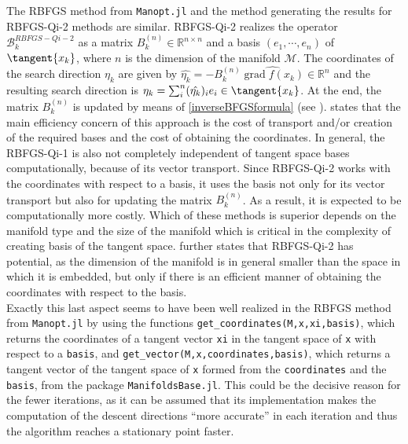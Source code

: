The RBFGS method from \lstinline!Manopt.jl! and the method generating the results for RBFGS-Qi-2 methods are similar. RBFGS-Qi-2 realizes the operator $\mathcal{B}^{RBFGS-Qi-2}_k$ as a matrix $B^{(n)}_k \in \mathbb{R}^{n \times n}$ and a basis $(e_1, \cdots, e_n)$ of $\tangent{x_k}$, where $n$ is the dimension of the manifold $\mathcal{M}$. The coordinates of the search direction $\eta_k$ are given by $\hat{\eta_k} = - B^{(n)}_k \widehat{\operatorname{grad} f(x_k)} \in \mathbb{R}^n$ and the resulting search direction is $\eta_k = \sum^{n}_i (\hat{\eta_k})_i e_i \in \tangent{x_k}$. At the end, the matrix $B^{(n)}_k$ is updated by means of \cref{inverseBFGSformula} (see \cite[3.3.2~Approach~2]{Qi:2011}). \cite{Qi:2011} states that the main efficiency concern of this approach is the cost of transport and/or creation of the required bases and the cost of obtaining the coordinates. In general, the RBFGS-Qi-1 is also not completely independent of tangent space bases computationally, because of its vector transport. Since RBFGS-Qi-2 works with the coordinates with respect to a basis, it uses the basis not only for its vector transport but also for updating the matrix $B^{(n)}_k$. As a result, it is expected to be computationally more costly. Which of these methods is superior depends on the manifold type and the size of the manifold which is critical in the complexity of creating basis of the tangent space. \cite{Qi:2011} further states that RBFGS-Qi-2 has potential, as the dimension of the manifold is in general smaller than the space in which it is embedded, but only if there is an efficient manner of obtaining the coordinates with respect to the basis. \\
Exactly this last aspect seems to have been well realized in the RBFGS method from \lstinline!Manopt.jl! by using the functions \lstinline!get_coordinates(M,x,xi,basis)!, which returns the coordinates of a tangent vector \lstinline!xi! in the tangent space of \lstinline!x! with respect to a \lstinline!basis!, and \lstinline!get_vector(M,x,coordinates,basis)!, which returns a tangent vector of the tangent space of \lstinline!x! formed from the \lstinline!coordinates! and the \lstinline!basis!, from the package \lstinline!ManifoldsBase.jl!. This could be the decisive reason for the fewer iterations, as it can be assumed that its implementation makes the computation of the descent directions “more accurate” in each iteration and thus the algorithm reaches a stationary point faster. 